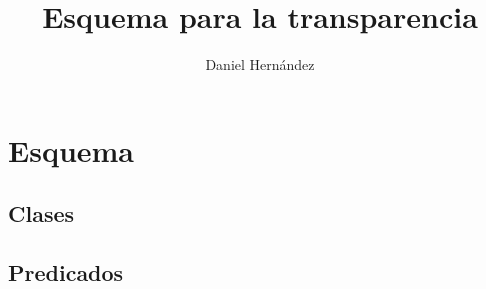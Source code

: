 \documentclass{article}
\title{Esquema para la transparencia}
\author{Daniel Hernández}
\begin{document}
\maketitle

\tableofcontents

\section{Esquema}

\subsection{Clases}



\subsection{Predicados}


\end{document}
